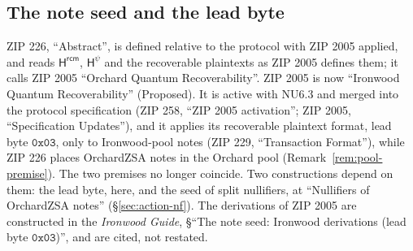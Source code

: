 \documentclass[11pt,a4paper]{article}
\theoremstyle{definition}
\begin{document}
\subsection{The note seed and the lead byte}\label{sec:notes-seed}

ZIP 226, ``Abstract'', is defined relative to the protocol with ZIP 2005
applied, and reads $\mathsf{H}^{\mathsf{rcm}}$, $\mathsf{H}^{\psi}$ and the
recoverable plaintexts as ZIP 2005 defines them; it calls ZIP 2005
``Orchard Quantum Recoverability''. ZIP 2005 is now ``Ironwood Quantum
Recoverability'' (Proposed). It is active with NU6.3 and merged into the
protocol specification (ZIP 258, ``ZIP 2005 activation''; ZIP 2005,
``Specification Updates''), and it applies its recoverable plaintext format,
lead byte $\mathtt{0x03}$, only to Ironwood-pool notes (ZIP 229,
``Transaction Format''), while ZIP 226 places OrchardZSA notes in the
Orchard pool (Remark~\ref{rem:pool-premise}). The two premises no longer
coincide. Two constructions depend on them: the lead byte, here, and the
seed of split nullifiers, at ``Nullifiers of OrchardZSA notes''
(\S\ref{sec:action-nf}). The derivations of ZIP 2005 are constructed in the
\emph{Ironwood Guide}, \S``The note seed: Ironwood derivations (lead byte
$\mathtt{0x03}$)'', and are cited, not restated.
\end{document}
